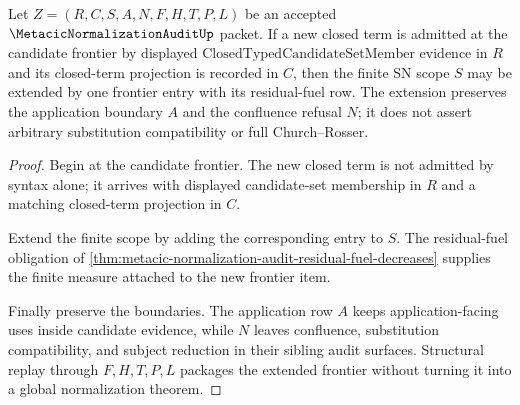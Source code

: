 \begin{theorem}
\label{thm:metacic-normalization-audit-candidate-frontier-extension}
Let $Z=(R,C,S,A,N,F,H,T,P,L)$ be an accepted $\MetacicNormalizationAuditUp$ packet. If a new closed term is admitted at the candidate frontier by displayed $\mathrm{ClosedTypedCandidateSetMember}$ evidence in $R$ and its closed-term projection is recorded in $C$, then the finite SN scope $S$ may be extended by one frontier entry with its residual-fuel row. The extension preserves the application boundary $A$ and the confluence refusal $N$; it does not assert arbitrary substitution compatibility or full Church--Rosser.
\end{theorem}
\begin{proof}
Begin at the candidate frontier. The new closed term is not admitted by syntax alone; it arrives with displayed candidate-set membership in $R$ and a matching closed-term projection in $C$.

Extend the finite scope by adding the corresponding entry to $S$. The residual-fuel obligation of \autoref{thm:metacic-normalization-audit-residual-fuel-decreases} supplies the finite measure attached to the new frontier item.

Finally preserve the boundaries. The application row $A$ keeps application-facing uses inside candidate evidence, while $N$ leaves confluence, substitution compatibility, and subject reduction in their sibling audit surfaces. Structural replay through $F,H,T,P,L$ packages the extended frontier without turning it into a global normalization theorem.
\end{proof}

